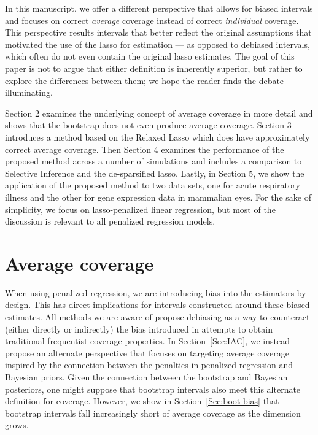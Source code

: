 In this manuscript, we offer a different perspective that allows for biased intervals and focuses on correct \emph{average} coverage instead of correct \emph{individual} coverage. This perspective results intervals that better reflect the original assumptions that motivated the use of the lasso for estimation --- as opposed to debiased intervals, which often do not even contain the original lasso estimates. The goal of this paper is not to argue that either definition is inherently superior, but rather to explore the differences between them; we hope the reader finds the debate illuminating.

Section 2 examines the underlying concept of average coverage in more detail and shows that the bootstrap does not even produce average coverage. Section 3 introduces a method based on the Relaxed Lasso which does have approximately correct average coverage. Then Section 4 examines the performance of the proposed method across a number of simulations and includes a comparison to Selective Inference and the de-sparsified lasso. Lastly, in Section 5, we show the application of the proposed method to two data sets, one for acute respiratory illness and the other for gene expression data in mammalian eyes. For the sake of simplicity, we focus on lasso-penalized linear regression, but most of the discussion is relevant to all penalized regression models.

\section{Average coverage}
\label{Sec:difficulties}

When using penalized regression, we are introducing bias into the estimators by design. This has direct implications for intervals constructed around these biased estimates. All methods we are aware of propose debiasing as a way to counteract (either directly or indirectly) the bias introduced in attempts to obtain traditional frequentist coverage properties. In Section~\ref{Sec:IAC}, we instead propose an alternate perspective that focuses on targeting average coverage inspired by the connection between the penalties in penalized regression and Bayesian priors. Given the connection between the bootstrap and Bayesian posteriors, one might suppose that bootstrap intervals also meet this alternate definition for coverage. However, we show in Section~\ref{Sec:boot-bias} that bootstrap intervals fall increasingly short of average coverage as the dimension grows.

